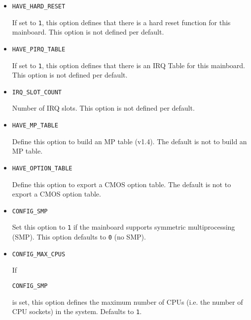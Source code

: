 \documentclass[titlepage,12pt]{article}
\begin{document}
\begin{itemize}

\item \begin{verbatim}HAVE_HARD_RESET\end{verbatim}

If set to \texttt{1}, this option defines that there is a hard reset
function for this mainboard.  This option is not defined per default.

\item \begin{verbatim}HAVE_PIRQ_TABLE\end{verbatim}

If set to \texttt{1}, this option defines that there is an IRQ Table for
this mainboard. This option is not defined per default.

\item \begin{verbatim}IRQ_SLOT_COUNT\end{verbatim}

Number of IRQ slots. This option is not defined per default.

\item \begin{verbatim}HAVE_MP_TABLE\end{verbatim}

Define this option to build an MP table (v1.4). The default is not to
build an MP table.

\item \begin{verbatim}HAVE_OPTION_TABLE\end{verbatim}

Define this option to export a CMOS option table. The default is not to
export a CMOS option table.

\item \begin{verbatim}CONFIG_SMP\end{verbatim}

Set this option to \texttt{1} if the mainboard supports symmetric
multiprocessing (SMP). This option defaults to \texttt{0} (no SMP).

\item \begin{verbatim}CONFIG_MAX_CPUS\end{verbatim}

If \begin{verbatim}CONFIG_SMP\end{verbatim} is set, this option defines
the maximum number of CPUs (i.e. the number of CPU sockets) in the
system. Defaults to \texttt{1}.


\end{itemize}
\end{document}
